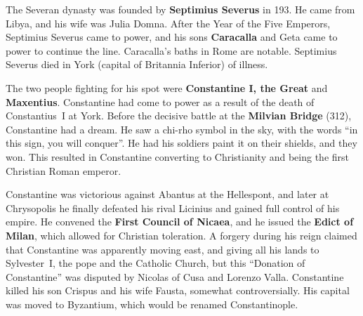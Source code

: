 The Severan dynasty was founded by \textbf{Septimius Severus} in 193.
He came from Libya, and his wife was Julia Domna.
After the Year of the Five Emperors, Septimius Severus came to power,
and his sons \textbf{Caracalla} and Geta came to power to continue the line.
Caracalla's baths in Rome are notable.
Septimius Severus died in York (capital of Britannia Inferior) of illness.

The two people fighting for his spot were \textbf{Constantine I, the Great} and \textbf{Maxentius}.
Constantine had come to power as a result of the death of Constantius~I at York.
Before the decisive battle at the \textbf{Milvian Bridge} (312), Constantine had a dream.
He saw a chi-rho symbol in the sky, with the words ``in this sign, you will conquer''.
He had his soldiers paint it on their shields, and they won.
This resulted in Constantine converting to Christianity and being the first Christian Roman emperor.

Constantine was victorious against Abantus at the Hellespont,
and later at Chrysopolis he finally defeated his rival Licinius and gained full control of his empire.
He convened the \textbf{First Council of Nicaea}, and he issued the \textbf{Edict of Milan},
which allowed for Christian toleration.
A forgery during his reign claimed that Constantine was apparently moving east,
and giving all his lands to Sylvester~I, the pope and the Catholic Church,
but this ``Donation of Constantine'' was disputed by Nicolas of Cusa and Lorenzo Valla.
Constantine killed his son Crispus and his wife Fausta, somewhat controversially.
His capital was moved to Byzantium, which would be renamed Constantinople.
